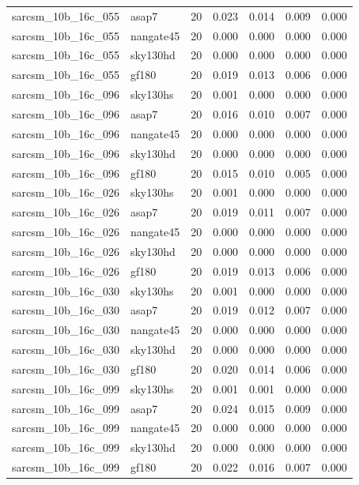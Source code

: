 \begin{tabular}{llrrrrr}
sarcsm\_10b\_16c\_055 & asap7 & 20 & 0.023 & 0.014 & 0.009 & 0.000 \\
sarcsm\_10b\_16c\_055 & nangate45 & 20 & 0.000 & 0.000 & 0.000 & 0.000 \\
sarcsm\_10b\_16c\_055 & sky130hd & 20 & 0.000 & 0.000 & 0.000 & 0.000 \\
sarcsm\_10b\_16c\_055 & gf180 & 20 & 0.019 & 0.013 & 0.006 & 0.000 \\
sarcsm\_10b\_16c\_096 & sky130hs & 20 & 0.001 & 0.000 & 0.000 & 0.000 \\
sarcsm\_10b\_16c\_096 & asap7 & 20 & 0.016 & 0.010 & 0.007 & 0.000 \\
sarcsm\_10b\_16c\_096 & nangate45 & 20 & 0.000 & 0.000 & 0.000 & 0.000 \\
sarcsm\_10b\_16c\_096 & sky130hd & 20 & 0.000 & 0.000 & 0.000 & 0.000 \\
sarcsm\_10b\_16c\_096 & gf180 & 20 & 0.015 & 0.010 & 0.005 & 0.000 \\
sarcsm\_10b\_16c\_026 & sky130hs & 20 & 0.001 & 0.000 & 0.000 & 0.000 \\
sarcsm\_10b\_16c\_026 & asap7 & 20 & 0.019 & 0.011 & 0.007 & 0.000 \\
sarcsm\_10b\_16c\_026 & nangate45 & 20 & 0.000 & 0.000 & 0.000 & 0.000 \\
sarcsm\_10b\_16c\_026 & sky130hd & 20 & 0.000 & 0.000 & 0.000 & 0.000 \\
sarcsm\_10b\_16c\_026 & gf180 & 20 & 0.019 & 0.013 & 0.006 & 0.000 \\
sarcsm\_10b\_16c\_030 & sky130hs & 20 & 0.001 & 0.000 & 0.000 & 0.000 \\
sarcsm\_10b\_16c\_030 & asap7 & 20 & 0.019 & 0.012 & 0.007 & 0.000 \\
sarcsm\_10b\_16c\_030 & nangate45 & 20 & 0.000 & 0.000 & 0.000 & 0.000 \\
sarcsm\_10b\_16c\_030 & sky130hd & 20 & 0.000 & 0.000 & 0.000 & 0.000 \\
sarcsm\_10b\_16c\_030 & gf180 & 20 & 0.020 & 0.014 & 0.006 & 0.000 \\
sarcsm\_10b\_16c\_099 & sky130hs & 20 & 0.001 & 0.001 & 0.000 & 0.000 \\
sarcsm\_10b\_16c\_099 & asap7 & 20 & 0.024 & 0.015 & 0.009 & 0.000 \\
sarcsm\_10b\_16c\_099 & nangate45 & 20 & 0.000 & 0.000 & 0.000 & 0.000 \\
sarcsm\_10b\_16c\_099 & sky130hd & 20 & 0.000 & 0.000 & 0.000 & 0.000 \\
sarcsm\_10b\_16c\_099 & gf180 & 20 & 0.022 & 0.016 & 0.007 & 0.000 \\

\end{tabular}
